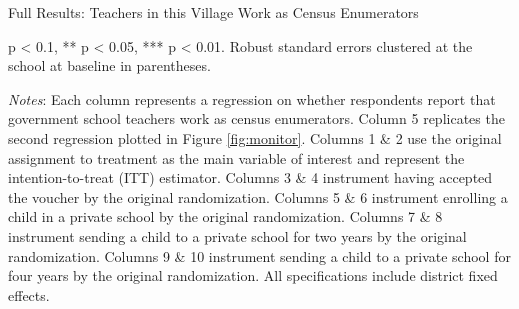 \documentclass[hidelinks, 12pt, titlepage]{article}
\begin{document}
\begin{landscape}
				\begin{table}
					\begin{threeparttable}
						\centering
						\caption{Full Results: Teachers in this Village Work as Census Enumerators\label{table:appendixcensusenumerators}}
						
						\begin{tablenotes}
							\item * p < 0.1, ** p < 0.05, *** p < 0.01. Robust standard errors clustered at the school at baseline in parentheses.
							\item \emph{Notes}: Each column represents a regression on whether respondents report that government school teachers work as census enumerators.  Column 5 replicates the second regression plotted in Figure \ref{fig:monitor}.  Columns 1 \& 2 use the original assignment to treatment as the main variable of interest and represent the intention-to-treat (ITT) estimator.  Columns 3 \& 4 instrument having accepted the voucher by the original randomization.  Columns 5 \& 6 instrument enrolling a child in a private school by the original randomization.  Columns 7 \& 8 instrument sending a child to a private school for two years by the original randomization.  Columns 9 \& 10 instrument sending a child to a private school for four years by the original randomization.  All specifications include district fixed effects.
						\end{tablenotes}
					\end{threeparttable}
				\end{table}

				\clearpage

				\end{landscape}
\end{document}
